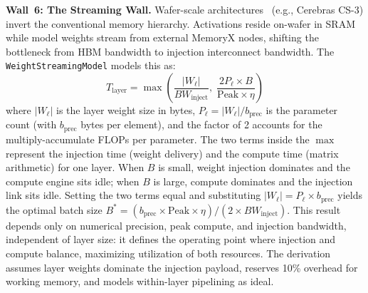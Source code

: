 \documentclass[10pt,twocolumn]{article}
\begin{document}
\textbf{Wall~6: The Streaming Wall.} Wafer-scale architectures~\citep{lie2022cerebras} (e.g., Cerebras CS-3) invert the conventional memory hierarchy. Activations reside on-wafer in SRAM while model weights stream from external MemoryX nodes, shifting the bottleneck from HBM bandwidth to injection interconnect bandwidth. The \texttt{WeightStreamingModel} models this as:
\begin{equation}
\label{eq:weightstream}
T_{\text{layer}} = \max\!\left(\frac{|W_{\ell}|}{BW_{\text{inject}}},\; \frac{2P_{\ell} \times B}{\text{Peak} \times \eta}\right)
\end{equation}
where $|W_{\ell}|$ is the layer weight size in bytes, $P_{\ell} = |W_{\ell}| / b_{\text{prec}}$ is the parameter count (with $b_{\text{prec}}$ bytes per element), and the factor of 2 accounts for the multiply-accumulate FLOPs per parameter. The two terms inside the $\max$ represent the injection time (weight delivery) and the compute time (matrix arithmetic) for one layer. When $B$ is small, weight injection dominates and the compute engine sits idle; when $B$ is large, compute dominates and the injection link sits idle. Setting the two terms equal and substituting $|W_{\ell}| = P_{\ell} \times b_{\text{prec}}$ yields the optimal batch size $B^{*} = (b_{\text{prec}} \times \text{Peak} \times \eta) / (2 \times BW_{\text{inject}})$. This result depends only on numerical precision, peak compute, and injection bandwidth, independent of layer size: it defines the operating point where injection and compute balance, maximizing utilization of both resources. The derivation assumes layer weights dominate the injection payload, reserves 10\% overhead for working memory, and models within-layer pipelining as ideal.
\end{document}
